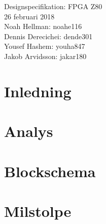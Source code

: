 \documentclass[12pt]{article}
\begin{document}
\begin{center}
\vspace*{2cm}
{\Huge Designspecifikation: FPGA Z80}\\
\vspace{2cm}
{\large 26 februari 2018}\\
\vspace{2cm}
Noah Hellman: noahe116 \\
Dennis Derecichei: dende301 \\
Yousef Hashem: youha847 \\
Jakob Arvidsson: jakar180 \\
\end{center}

\vspace{2cm}
\tableofcontents
\newpage

\section{Inledning}
\section{Analys}
\section{Blockschema}
\section{Milstolpe}
\end{document}
